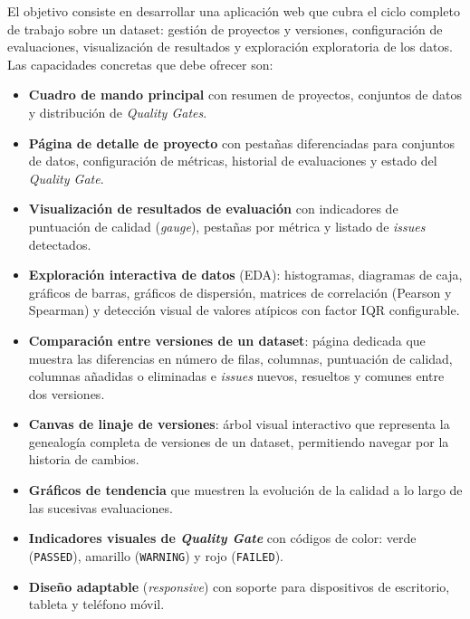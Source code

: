 El objetivo consiste en desarrollar una aplicación web que cubra el ciclo
completo de trabajo sobre un dataset: gestión de proyectos y versiones,
configuración de evaluaciones, visualización de resultados y exploración
exploratoria de los datos.  Las capacidades concretas que debe ofrecer son:

\begin{itemize}
  \item \textbf{Cuadro de mando principal} con resumen de proyectos,
    conjuntos de datos y distribución de \emph{Quality Gates}.

  \item \textbf{Página de detalle de proyecto} con pestañas diferenciadas
    para conjuntos de datos, configuración de métricas, historial de
    evaluaciones y estado del \emph{Quality Gate}.

  \item \textbf{Visualización de resultados de evaluación} con indicadores de
    puntuación de calidad (\emph{gauge}), pestañas por métrica y listado de
    \emph{issues} detectados.

  \item \textbf{Exploración interactiva de datos} (\ac{EDA}): histogramas,
    diagramas de caja, gráficos de barras, gráficos de dispersión,
    matrices de correlación (Pearson y Spearman) y detección visual de
    valores atípicos con factor \ac{IQR} configurable.

  \item \textbf{Comparación entre versiones de un dataset}: página dedicada
    que muestra las diferencias en número de filas, columnas, puntuación
    de calidad, columnas añadidas o eliminadas e \emph{issues} nuevos,
    resueltos y comunes entre dos versiones.

  \item \textbf{Canvas de linaje de versiones}: árbol visual interactivo
    que representa la genealogía completa de versiones de un dataset,
    permitiendo navegar por la historia de cambios.

  \item \textbf{Gráficos de tendencia} que muestren la evolución de la
    calidad a lo largo de las sucesivas evaluaciones.

  \item \textbf{Indicadores visuales de \emph{Quality Gate}} con códigos de
    color: verde (\texttt{PASSED}), amarillo (\texttt{WARNING}) y rojo
    (\texttt{FAILED}).

  \item \textbf{Diseño adaptable} (\emph{responsive}) con soporte para
    dispositivos de escritorio, tableta y teléfono móvil.
\end{itemize}


